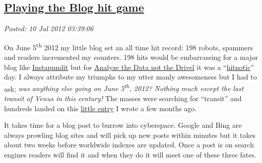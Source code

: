 %

\subsection*{\href{http://bakerjd99.wordpress.com/2012/07/09/playing-the-blog-hit-game/}{Playing the Blog hit game}}


\noindent\emph{Posted: 10 Jul 2012 03:39:06}
\vspace{6pt}

On June 5\textsuperscript{th} 2012 my little blog set an all time hit
record: 198 robots, spammers and readers incremented my counters. 198
hits would be embarrassing for a major blog like
\href{http://pjmedia.com/instapundit/}{Instapundit} but for
\href{http://bakerjd99.wordpress.com/}{Analyze the Data not the Drivel}
it was a
``\href{http://www.samizdata.net/blog/glossary\_archives/2002/09/hitnosis.html}{hitnotic}''
day. I always attribute my triumphs to my utter manly awesomeness but I
had to ask; \emph{was anything else going on June 5\textsuperscript{th},
2012? Nothing much except the last transit of Venus in this century!} The
masses were searching for ``transit'' and hundreds landed on this
\href{http://bakerjd99.wordpress.com/2012/04/22/2012-venus-transit-and-annular-eclipse/}{little
entry} I wrote a few months ago.

It takes time for a blog post to burrow into cyberspace. Google and Bing
are always prowling blog sites and will pick up new posts within minutes
but it takes about two weeks before worldwide indexes are updated. Once
a post is on search engines readers will find it and when they do it
will meet one of these three fates.

